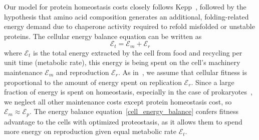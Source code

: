 \documentclass[10pt,letterpaper]{article}
\begin{document}
Our model for protein homeostasis costs closely follows Kepp~\cite{Kepp2014Model}, followed by the hypothesis that amino acid composition generates an additional, folding-related energy demand due to chaperone activity required to refold misfolded or unstable proteins. The cellular energy balance equation can be written as
\begin{equation}
	\label{cell_energy_balance}
	\mathcal{E}_{t} = \mathcal{E}_{m} + \mathcal{E}_{r}
\end{equation}
where $\mathcal{E}_{t}$ is the total energy extracted by the cell from food and recycling per unit time (metabolic rate), this energy is being spent on the cell's machinery maintenance $\mathcal{E}_{m}$ and reproduction $\mathcal{E}_{r}$. As in~\cite{Kepp2014Model}, we assume that cellular fitness is proportional to the amount of energy spent on replication $\mathcal{E}_{r}$.  Since a large fraction of energy is spent on homeostasis, especially in the case of prokaryotes~\cite{Harold1987Vital}, we neglect all other maintenance costs except protein homeostasis cost, so $\mathcal{E}_{m}\approx\mathcal{E}_{p}$.
The energy balance equation~\eqref{cell_energy_balance} confers fitness advantage to the cells with optimized proteostasis, as it allows them to spend more energy on reproduction given equal metabolic rate $\mathcal{E}_{t}$. 
\end{document}
